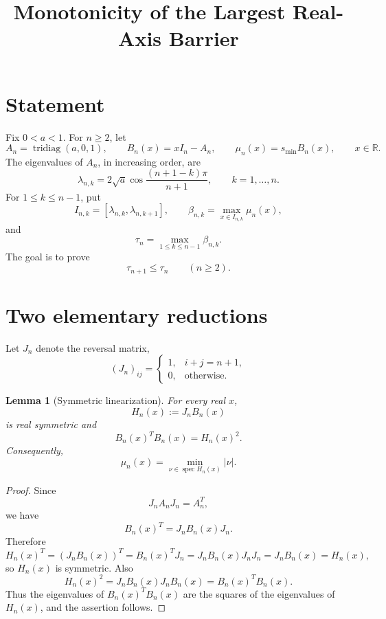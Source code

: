 \documentclass[11pt]{amsart}
\title{Monotonicity of the Largest Real-Axis Barrier}
\author{}
\date{}
\numberwithin{equation}{section}
\newtheorem{lemma}[theorem]{Lemma}
\DeclareMathOperator{\tridiag}{tridiag}
\DeclareMathOperator{\spec}{spec}
\begin{document}
\maketitle

\section{Statement}

Fix \(0<a<1\).  For \(n\ge2\), let
\[
        A_n=\tridiag(a,0,1),
        \qquad
        B_n(x)=xI_n-A_n,
        \qquad
        \mu_n(x)=s_{\min}B_n(x),
        \qquad x\in\mathbb R .
\]
The eigenvalues of \(A_n\), in increasing order, are
\[
        \lambda_{n,k}
        =
        2\sqrt a\cos\frac{(n+1-k)\pi}{n+1},
        \qquad k=1,\dots,n.
\]
For \(1\le k\le n-1\), put
\[
        I_{n,k}=[\lambda_{n,k},\lambda_{n,k+1}],
        \qquad
        \beta_{n,k}
        =
        \max_{x\in I_{n,k}}\mu_n(x),
\]
and
\[
        \tau_n=\max_{1\le k\le n-1}\beta_{n,k}.
\]
The goal is to prove
\[
        \tau_{n+1}\le \tau_n
        \qquad (n\ge2).
\]

\section{Two elementary reductions}

Let \(J_n\) denote the reversal matrix,
\[
        (J_n)_{ij}=
        \begin{cases}
        1,& i+j=n+1,\\
        0,& \text{otherwise}.
        \end{cases}
\]

\begin{lemma}[Symmetric linearization]\label{lem:sym-lin}
For every real \(x\),
\[
        H_n(x):=J_nB_n(x)
\]
is real symmetric and
\[
        B_n(x)^TB_n(x)=H_n(x)^2.
\]
Consequently,
\[
        \mu_n(x)=\min_{\nu\in\spec H_n(x)}|\nu|.
\]
\end{lemma}

\begin{proof}
Since
\[
        J_nA_nJ_n=A_n^T,
\]
we have
\[
        B_n(x)^T=J_nB_n(x)J_n.
\]
Therefore
\[
        H_n(x)^T=(J_nB_n(x))^T=B_n(x)^TJ_n
        =J_nB_n(x)J_nJ_n=J_nB_n(x)=H_n(x),
\]
so \(H_n(x)\) is symmetric.  Also
\[
        H_n(x)^2=J_nB_n(x)J_nB_n(x)=B_n(x)^TB_n(x).
\]
Thus the eigenvalues of \(B_n(x)^TB_n(x)\) are the squares of the
eigenvalues of \(H_n(x)\), and the assertion follows.
\end{proof}
\end{document}
